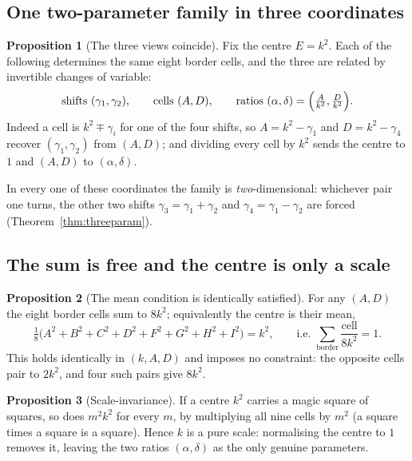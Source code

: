 \documentclass[11pt]{article}
\theoremstyle{definition}
\newtheorem{proposition}{Proposition}
\begin{document}
\subsection{One two-parameter family in three coordinates}

\begin{proposition}[The three views coincide]\label{prop:threeviews}
Fix the centre $E=k^{2}$. Each of the following determines the same eight
border cells, and the three are related by invertible changes of variable:
\[
  \text{shifts } (\gamma_1,\gamma_2),\qquad
  \text{cells } (A,D),\qquad
  \text{ratios } (\alpha,\delta)=\Bigl(\tfrac{A}{k^{2}},\tfrac{D}{k^{2}}\Bigr).
\]
Indeed a cell is $k^{2}\mp\gamma_i$ for one of the four shifts, so $A=k^{2}-\gamma_1$
and $D=k^{2}-\gamma_4$ recover $(\gamma_1,\gamma_2)$ from $(A,D)$; and dividing every
cell by $k^{2}$ sends the centre to $1$ and $(A,D)$ to $(\alpha,\delta)$.
\end{proposition}

\noindent In every one of these coordinates the family is \emph{two}-dimensional:
whichever pair one turns, the other two shifts $\gamma_3=\gamma_1+\gamma_2$ and
$\gamma_4=\gamma_1-\gamma_2$ are forced (Theorem~\ref{thm:threeparam}).

\subsection{The sum is free and the centre is only a scale}

\begin{proposition}[The mean condition is identically satisfied]\label{prop:sumfree}
For any $(A,D)$ the eight border cells sum to $8k^{2}$; equivalently the centre is
their mean,
\[
  \tfrac{1}{8}\bigl(A^{2}+B^{2}+C^{2}+D^{2}+F^{2}+G^{2}+H^{2}+I^{2}\bigr)=k^{2},
  \qquad\text{i.e. } \sum_{\text{border}}\frac{\text{cell}}{8k^{2}}=1 .
\]
This holds identically in $(k,A,D)$ and imposes no constraint: the opposite cells
pair to $2k^{2}$, and four such pairs give $8k^{2}$.
\end{proposition}

\begin{proposition}[Scale-invariance]\label{prop:scale}
If a centre $k^{2}$ carries a magic square of squares, so does $m^{2}k^{2}$ for every
$m$, by multiplying all nine cells by $m^{2}$ (a square times a square is a square).
Hence $k$ is a pure scale: normalising the centre to $1$ removes it, leaving the two
ratios $(\alpha,\delta)$ as the only genuine parameters.
\end{proposition}
\end{document}
